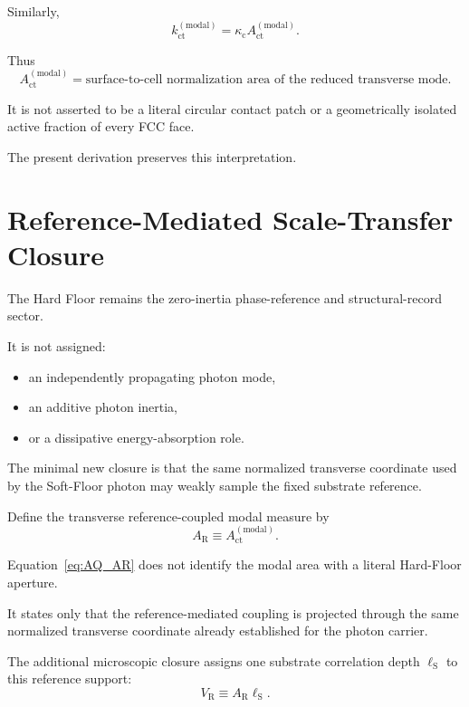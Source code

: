 Similarly,
\begin{equation}
    k_{\mathrm{ct}}^{(\mathrm{modal})}
    =
    \kappa_{\mathrm c}
    A_{\mathrm{ct}}^{(\mathrm{modal})}.
    \label{eq:AQ_modal_stiffness}
\end{equation}

Thus
\begin{equation}
    \boxed{
    A_{\mathrm{ct}}^{(\mathrm{modal})}
    =
    \text{surface-to-cell normalization area of the reduced transverse mode}.
    }
\end{equation}

It is not asserted to be a literal circular contact patch or a geometrically
isolated active fraction of every FCC face.

The present derivation preserves this interpretation.


\section{Reference-Mediated Scale-Transfer Closure}

The Hard Floor remains the zero-inertia phase-reference and structural-record
sector.

It is not assigned:

\begin{itemize}
    \item an independently propagating photon mode,
    \item an additive photon inertia,
    \item or a dissipative energy-absorption role.
\end{itemize}

The minimal new closure is that the same normalized transverse coordinate used
by the Soft-Floor photon may weakly sample the fixed substrate reference.

Define the transverse reference-coupled modal measure by
\begin{equation}
    \boxed{
    A_{\mathrm R}
    \equiv
    A_{\mathrm{ct}}^{(\mathrm{modal})}.
    }
    \label{eq:AQ_AR}
\end{equation}

Equation~\eqref{eq:AQ_AR} does not identify the modal area with a literal
Hard-Floor aperture.

It states only that the reference-mediated coupling is projected through the
same normalized transverse coordinate already established for the photon
carrier.

The additional microscopic closure assigns one substrate correlation depth
$\ell_{\mathrm S}$ to this reference support:
\begin{equation}
    \boxed{
    V_{\mathrm R}
    \equiv
    A_{\mathrm R}\ell_{\mathrm S}.
    }
    \label{eq:AQ_VR}
\end{equation}

